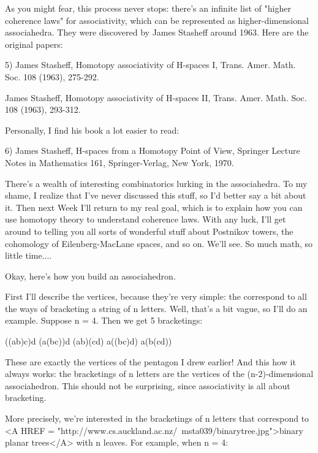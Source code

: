 As you might fear, this process never stops: there's an infinite list of
"higher coherence laws" for associativity, which can be
represented as higher-dimensional associahedra.  They were discovered by
James Stasheff around 1963.  Here are the original papers:

5) James Stasheff, Homotopy associativity of H-spaces I, Trans. Amer.
Math. Soc. 108 (1963), 275-292.

James Stasheff, Homotopy associativity of H-spaces II, Trans. Amer.
Math. Soc. 108 (1963), 293-312.

Personally, I find his book a lot easier to read:

6) James Stasheff, H-spaces from a Homotopy Point of View, Springer
Lecture Notes in Mathematics 161, Springer-Verlag, New York, 1970.

There's a wealth of interesting combinatorics lurking in the 
associahedra.  To my shame, I realize that I've never discussed this
stuff, so I'd better say a bit about it.  Then next Week I'll return 
to my real goal, which is to explain how you can use homotopy theory 
to understand coherence laws.   With any luck, I'll get around to
telling you all sorts of wonderful stuff about Postnikov towers, the
cohomology of Eilenberg-MacLane spaces, and so on.  We'll see.  So much
math, so little time....

Okay, here's how you build an associahedron.  

First I'll describe the vertices, because they're very simple: the
correspond to all the ways of bracketing a string of n letters.  Well, 
that's a bit vague, so I'll do an example.  Suppose n = 4.  Then we get 
5 bracketings:

((ab)c)d
(a(bc))d
(ab)(cd)
a((bc)d)
a(b(cd))

These are exactly the vertices of the pentagon I drew earlier!  And
this how it always works: the bracketings of n letters are the vertices 
of the (n-2)-dimensional associahedron.  This should not be surprising, 
since associativity is all about bracketing.

More precisely, we're interested in the bracketings of n letters that
correspond to <A HREF = "http://www.cs.auckland.ac.nz/~msta039/binarytree.jpg">binary planar trees</A> with n leaves.  For example, when 
n = 4:


